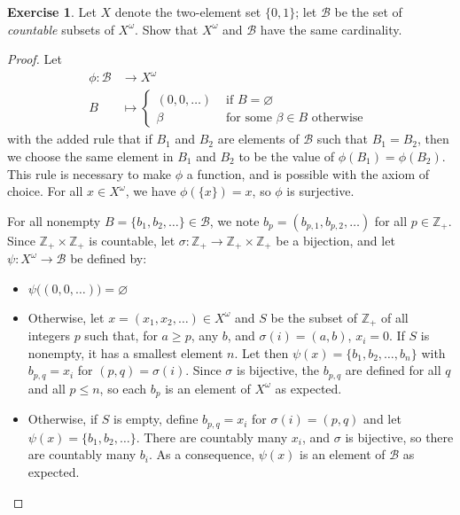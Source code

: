 \documentclass[11pt,a4paper,twoside]{article}
\theoremstyle{definition}
\newcounter{excounter}
\newtheorem{exercise}[excounter]{Exercise}
\begin{document}
\begin{exercise}

  Let $X$ denote the two-element set $\{ 0, 1 \}$; let $\mathscr{B}$ be the set of \emph{countable}
  subsets of $X^\omega$. Show that $X^\omega$ and $\mathscr{B}$ have the same cardinality.

\end{exercise}

\begin{proof}

  Let
  \begin{align*}
    \phi : \mathscr{B} &\to X^\omega \\
    B &\mapsto \begin{cases}
      (0, 0, \dotsc) &\text{ if } B = \varnothing \\
      \beta &\text{ for some } \beta \in B \text{ otherwise }
    \end{cases}
  \end{align*}
  with the added rule that if $B_1$ and $B_2$ are elements of $\mathscr{B}$ such that $B_1 = B_2$, then we choose the same element
  in $B_1$ and $B_2$ to be the value of $\phi (B_1) = \phi (B_2)$. This rule is necessary to make $\phi$ a function, and is possible
  with the axiom of choice. For all $x \in X^\omega$, we have $\phi ( \{ x \}) = x$, so $\phi$ is surjective.

  For all nonempty $B = \{ b_1, b_2, \dotsc \} \in \mathscr{B}$, we note $b_p = (b_{p, 1}, b_{p, 2}, \dotsc )$ for all $p \in \mathbb{Z}_+$.
  Since $\mathbb{Z}_+ \times \mathbb{Z}_+$ is countable, let $\sigma : \mathbb{Z}_+ \to \mathbb{Z}_+ \times \mathbb{Z}_+$ be a bijection,
  and let $\psi : X^\omega \to \mathscr{B}$ be defined by:
  \begin{itemize}

    \item $\psi \big( (0, 0, \dotsc) \big) = \varnothing$

    \item Otherwise, let $x = (x_1, x_2, \dotsc) \in X^\omega$ and $S$ be the subset of $\mathbb{Z}_+$ of all integers $p$ such that,
      for $a \geq p$, any $b$, and $\sigma (i) = (a, b)$, $x_i = 0$.
      If $S$ is nonempty, it has a smallest element $n$. Let then $\psi (x) = \{ b_1, b_2, \dotsc, b_n \}$ with $b_{p, q} = x_i$ for $(p, q) = \sigma (i)$.
      Since $\sigma$ is bijective, the $b_{p, q}$ are defined for all $q$ and all $p \leq n$, so each $b_p$ is an element of $X^\omega$ as expected.

    \item Otherwise, if $S$ is empty, define $b_{p, q} = x_i$ for $\sigma (i) = (p, q)$ and let $\psi (x) = \{ b_1, b_2, \dotsc \}$.
      There are countably many $x_i$, and $\sigma$ is bijective, so there are countably many $b_i$. As a consequence, $\psi (x)$ is an element of $\mathscr{B}$ as expected.


\end{itemize}
\end{proof}
\end{document}
